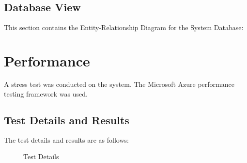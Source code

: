 \documentclass[11pt]{article}
\begin{document}
\subsection{Database View}
This section contains the Entity-Relationship Diagram for the System Database:
\begin{figure}[H]
	
\end{figure}


\section{Performance}
A stress test was conducted on the system. The Microsoft Azure performance testing framework was used. 
\subsection{Test Details and Results} The test details and results are as follows:
\begin{figure}[H]
	\caption{Test Details}
\end{figure}
\end{document}
